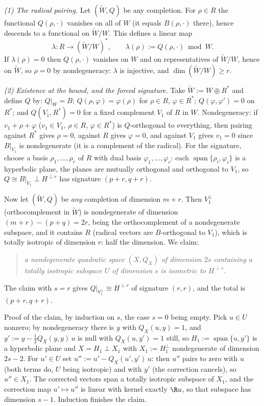 \emph{(1) The radical pairing.} Let $(\widetilde W, Q)$ be any completion. For $\rho \in R$ the functional $Q(\rho, \cdot)$ vanishes on all of $W$ (it equals $B(\rho, \cdot)$ there), hence descends to a functional on $\widetilde W / W$. This defines a linear map
\[
\lambda : R \longrightarrow (\widetilde W / W)^*, \qquad \lambda(\rho) := Q(\rho, \cdot) \bmod W .
\]
If $\lambda(\rho) = 0$ then $Q(\rho, \cdot)$ vanishes on $W$ and on representatives of $\widetilde W / W$, hence on $\widetilde W$, so $\rho = 0$ by nondegeneracy: $\lambda$ is injective, and $\dim(\widetilde W / W) \geq r$.

\emph{(2) Existence at the bound, and the forced signature.} Take $\widetilde W := W \oplus R^*$ and define $Q$ by: $Q|_W = B$; $Q(\rho, \varphi) = \varphi(\rho)$ for $\rho \in R$, $\varphi \in R^*$; $Q(\varphi, \varphi') = 0$ on $R^*$; and $Q(V_1, R^*) = 0$ for a fixed complement $V_1$ of $R$ in $W$. Nondegeneracy: if $v_1 + \rho + \varphi$ ($v_1 \in V_1$, $\rho \in R$, $\varphi \in R^*$) is $Q$-orthogonal to everything, then pairing against $R^*$ gives $\rho = 0$, against $R$ gives $\varphi = 0$, and against $V_1$ gives $v_1 = 0$ since $B|_{V_1}$ is nondegenerate (it is a complement of the radical). For the signature, choose a basis $\rho_1, \dots, \rho_r$ of $R$ with dual basis $\varphi_1, \dots, \varphi_r$: each $\operatorname{span}\{\rho_i, \varphi_i\}$ is a hyperbolic plane, the planes are mutually orthogonal and orthogonal to $V_1$, so $Q \cong B|_{V_1} \perp H^{\perp r}$ has signature $(p{+}r, q{+}r)$.

Now let $(\widetilde W, Q)$ be \emph{any} completion of dimension $m + r$. Then $V_1^{\perp}$ (orthocomplement in $\widetilde W$) is nondegenerate of dimension $(m{+}r) - (p{+}q) = 2r$, being the orthocomplement of a nondegenerate subspace, and it contains $R$ (radical vectors are $B$-orthogonal to $V_1$), which is totally isotropic of dimension $r$: half the dimension. We claim:
\begin{quote}
\emph{a nondegenerate quadratic space $(X, Q_X)$ of dimension $2s$ containing a totally isotropic subspace $U$ of dimension $s$ is isometric to $H^{\perp s}$.}
\end{quote}
The claim with $s = r$ gives $Q|_{V_1^\perp} \cong H^{\perp r}$ of signature $(r,r)$, and the total is $(p{+}r, q{+}r)$.

Proof of the claim, by induction on $s$, the case $s = 0$ being empty. Pick $u \in U$ nonzero; by nondegeneracy there is $y$ with $Q_X(u, y) = 1$, and $y' := y - \tfrac12 Q_X(y,y)\, u$ is null with $Q_X(u, y') = 1$ still, so $H_1 := \operatorname{span}\{u, y'\}$ is a hyperbolic plane and $X = H_1 \perp X_1$ with $X_1 := H_1^{\perp}$ nondegenerate of dimension $2s - 2$. For $u' \in U$ set $u'' := u' - Q_X(u', y')\, u$: then $u''$ pairs to zero with $u$ (both terms do, $U$ being isotropic) and with $y'$ (the correction cancels), so $u'' \in X_1$. The corrected vectors span a totally isotropic subspace of $X_1$, and the correction map $u' \mapsto u''$ is linear with kernel exactly $\R u$, so that subspace has dimension $s - 1$. Induction finishes the claim.

